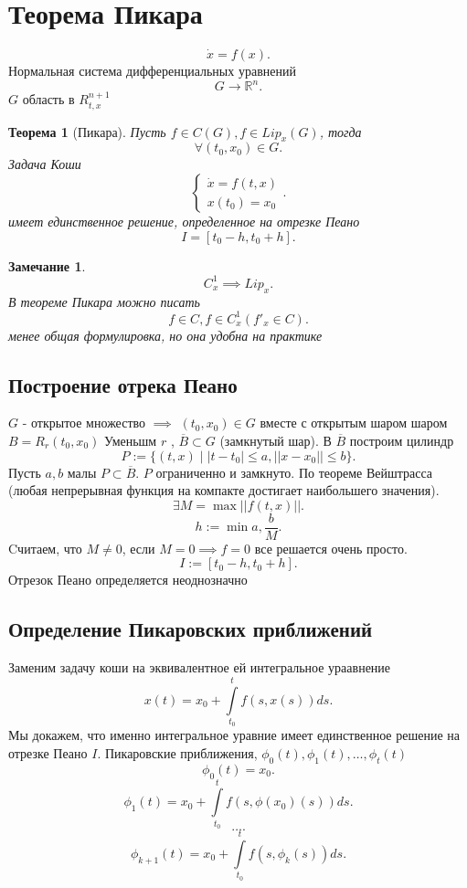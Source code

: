 \documentclass[14pt]{extarticle}
\newtheorem{theorem}{Теорема}
\newtheorem{zam}{Замечание}
\begin{document}
    \section{Теорема Пикара}
    \[
        \dot{x} = f(x)
    .\] 
    Нормальная система дифференциальных уравнений
    \[
    G \to \mathbb{R}^{n}
    .\] 
    $G$ область в  $R^{n+1}_{t,x}$
    \begin{theorem}[Пикара]
        Пусть $f \in C(G), f \in Lip_{x}(G)$, тогда
        \[
        \forall  (t_0,x_0) \in G
        .\] 
        Задача Коши 
        \[
            \begin{cases}
            \dot{x} = f(t,x)\\
            x(t_0) = x_0
            \end{cases}
        .\] 
        имеет единственное решение, определенное на отрезке Пеано
        \[
            I = [t_0-h,t_0+h]
        .\] 
     \end{theorem}
     \begin{zam}
         \[
         C^{1}_{x} \implies Lip_{x}
         .\] 
         В теореме Пикара можно писать 
         \[
         f \in C, f \in C^{1}_{x} (f'_{x} \in C)
         .\] 
         менее общая формулировка, но она удобна на практике
     \end{zam}
     \subsection{Построение отрека Пеано}
     $G$ - открытое множество $\implies$  $(t_0,x_0) \in G$ вместе с открытым шаром шаром $B = R_{r}(t_0,x_0)$ 
     Уменьшм $r$ , $\overline{B} \subset G$ (замкнутый шар). В $\overline{B}$ построим цилиндр
      \[
          P := \{(t,x) \mid |t-t_0| \le  a, ||x-x_0|| \le b\}
      .\] 
      Пусть $a,b$ малы  $P \subset \overline{B}$. $P$ ограниченно и замкнуто.
      По теореме Вейштрасса (любая непрерывная функция на компакте достигает наибольшего значения). 
      \[
          \exists  M = \max{||f(t,x)||}
      .\] 
      \[
          h := \min{a,\frac{b}{M}}
      .\] 
      Cчитаем, что $M \neq 0$, если $M = 0 \implies f = 0$ все решается очень просто.
       \[
           I := [t_0-h,t_0 + h]
      .\] 
      Отрезок Пеано определяется неоднозначно
      \subsection{Определение Пикаровских приближений}
      Заменим задачу коши на эквивалентное ей интегральное ураавнение
      \[
      x(t) = x_0 + \int\limits_{t_0}^{t} f(s,x(s))  ds
      .\] 
      Мы докажем, что именно интегральное уравние имеет единственное решение на отрезке Пеано $I$. Пикаровские приближения,  $\phi_0(t),\phi_{1}(t),\dots,\phi_{t}(t)$
      \[
      \phi_0(t) = x_0
      .\] 
      \[
      \phi_1(t) = x_0 + \int\limits_{t_0}^{t} f(s,\phi(x_0)(s))  ds
      .\] 
      \[
      \dots
      .\] 
      \[
      \phi_{k+1}(t) = x_0 + \int\limits_{t_0}^{t} f(s,\phi_{k}(s))  ds
      .\] 
\end{document}
